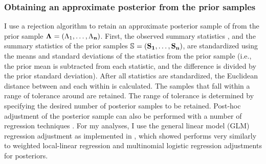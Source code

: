 \subsubsection{Obtaining an approximate posterior from the prior samples}
I use a rejection algorithm to retain an approximate posterior sample of
\paramSampleVector{} from the prior sample
$\boldsymbol{\Lambda_{}} = (\Lambda_{1}, \ldots, \Lambda_{\mathbf{n}})$.
First, the observed summary statistics \ssVectorObs, and the summary statistics
of the prior samples 
$\ssMatrix = (\ssVector{1}, \ldots, \ssVector{\numPriorSamples})$,
are standardized using the means and standard deviations of the statistics from
the prior sample (i.e., the prior mean is subtracted from each statistic, and the
difference is divided by the prior standard deviation).
After all statistics are standardized, the Euclidean distance between
\ssVectorObs and each \ssVector{} within \ssMatrix is calculated.
The samples that fall within a range of tolerance \tol around \ssVectorObs
are retained.
The range of tolerance is determined by specifying the desired number of
posterior samples to be retained.
Post-hoc adjustment of the posterior sample can also be performed with a number
of regression techniques \cite{Beaumont2002,Blum2009,Leuenberger2010}.
For my analyses, I use the general linear model (GLM) regression adjustment
\cite{Leuenberger2010} as implemented in \abctoolbox
\cite[v1.1;]{ABCtoolbox}, which \cite{Oaks2012} showed performs very
similarly to weighted local-linear regression and multinomial logistic
regression adjustments \cite{Beaumont2002} for \msb posteriors.


